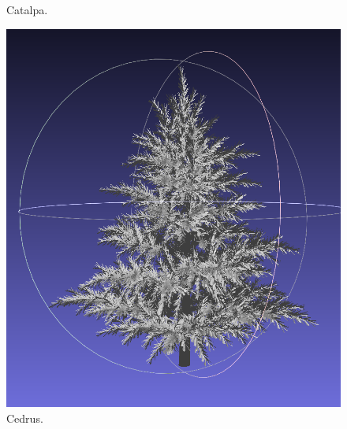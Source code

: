 \documentclass[12pt]{article}
\begin{document}
\begin{figure}[H]
\begin{minipage}{0.24\textwidth}
        \caption{Catalpa.}
    \end{minipage}
\end{figure}

\begin{figure}[H]
    \centering
    \begin{minipage}{0.24\textwidth}
        \centering
        \includegraphics[width=\textwidth]{images/cedrus.png}
        \caption{Cedrus.}
    \end{minipage}\hfill
    \begin{minipage}{0.24\textwidth}
        \centering

\end{minipage}
\end{figure}
\end{document}
